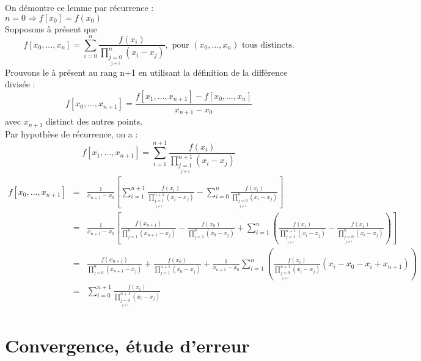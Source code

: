 \begin{dem}
On démontre ce lemme par récurrence : \\
$n=0 \Rightarrow f[x_0]=f(x_0)$\\
Supposons à présent que \[f[x_0,...,x_n]=\sum_{i=0}^n \frac{f(x_i)}{\prod_{\underset{j\neq i}{j=0}}^n (x_i-x_j)},\text{ pour } (x_0,...,x_n) \text{ tous distincts.}\]
Prouvons le à présent au rang n+1 en utilisant la définition de la différence divisée :
\[f[x_0,...,x_{n+1}]=\frac{f[x_1,...,x_{n+1}]-f[x_0,...,x_n]}{x_{n+1}-x_0}\]
avec $x_{n+1}$ distinct des autres points. \\
Par hypothèse de récurrence, on a :
\[f[x_1,...,x_{n+1}]=\sum_{i=1}^{n+1} \frac{f(x_i)}{\prod_{\underset{j\neq i}{j=1}}^{n+1} (x_i-x_j)}\]
\begin{eqnarray*}
f[x_0,...,x_{n+1}]&=&\frac{1}{x_{n+1}-x_0} \left[\sum_{i=1}^{n+1} \frac{f(x_i)}{\prod_{\underset{j\neq i}{j=1}}^{n+1} (x_i-x_j)}-\sum_{i=0}^n \frac{f(x_i)}{\prod_{\underset{j\neq i}{j=0}}^n (x_i-x_j)} \right]\\
		&=& \frac{1}{x_{n+1}-x_0}\left[\frac{f(x_{n+1})}{\prod_{j=1}^{n}(x_{n+1}-x_j)} - \frac{f(x_{0})}{\prod_{j=1}^{n}(x_0-x_j)}+\sum_{i=1}^n\left(\frac{f(x_i)}{\prod_{\underset{j\neq i}{j=1}}^{n+1} (x_i-x_j)}-\frac{f(x_i)}{\prod_{\underset{j\neq i}{j=0}}^n (x_i-x_j)} \right) \right] \\
		&=& \frac{f(x_{n+1})}{\prod_{j=0}^{n}(x_{n+1}-x_j)} + \frac{f(x_{0})}{\prod_{j=1}^{n+1}(x_0-x_j)} + \frac{1}{x_{n+1}-x_0} \sum_{i=1}^n\left(\frac{f(x_i)}{\prod_{\underset{j\neq i}{j=0}}^{n+1} (x_i-x_j)}(x_i-x_0-x_i+x_{n+1}) \right) \\
		&=& \sum_{i=0}^{n+1} \frac{f(x_i)}{\prod_{\underset{j\neq i}{j=0}}^{n+1} (x_i-x_j)}
\end{eqnarray*}
\end{dem}


\section{Convergence, étude d'erreur}
\Theo{}{Soient $x_0,...,x_n$ distincts, $f\in\mathcal{C}^{n+1}$ sur $[\min\{x_0,...,x_n\},\max\{x_0,...,x_n\}]$ et $L_n(f,x)$ son polynôme d'interpolation.
\[\forall x\in\left[\min\{x_0,...,x_n\},\max\{x_0,...,x_n\}\right],\exists \zeta \in \left]\min\{x_0,...,x_n\},\max\{x_0,...,x_n\}\right[ \]
\[f(x)-L_n(f,x)=\frac{f^{(n+1)}(\zeta)}{(n+1)!}\omega_n(x)\]}

